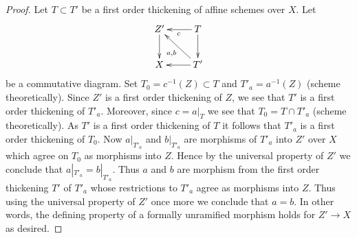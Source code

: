 \documentclass[10pt,a4paper]{amsart}
\theoremstyle{plain}
\theoremstyle{definition}
\theoremstyle{remark}
\numberwithin{equation}{subsection}
\begin{document}
\begin{proof}
Let $T \subset T'$ be a first order thickening of affine schemes over $X$.
Let
$$
\xymatrix{
Z' \ar[d] & T \ar[l]^c \ar[d] \\
X & T' \ar[l] \ar[lu]^{a, b}
}
$$
be a commutative diagram. Set $T_0 = c^{-1}(Z) \subset T$ and
$T'_a = a^{-1}(Z)$ (scheme theoretically).
Since $Z'$ is a first order thickening of $Z$, we see that $T'$
is a first order thickening of $T'_a$. Moreover, since $c = a|_T$ we see that
$T_0 = T \cap T'_a$ (scheme theoretically). As $T'$ is a first order
thickening of $T$ it follows that $T'_a$
is a first order thickening of $T_0$. Now $a|_{T'_a}$ and $b|_{T'_a}$
are morphisms of $T'_a$ into $Z'$ over $X$ which agree on $T_0$ as
morphisms into $Z$. Hence by the universal property of $Z'$ we conclude that
$a|_{T'_a} = b|_{T'_a}$. Thus $a$ and $b$ are morphism from
the first order thickening $T'$ of $T'_a$ whose restrictions to
$T'_a$ agree as morphisms into $Z$. Thus using the universal property of
$Z'$ once more we conclude that $a = b$. In other words, the defining
property of a formally unramified morphism holds for $Z' \to X$ as desired.
\end{proof}
\end{document}
